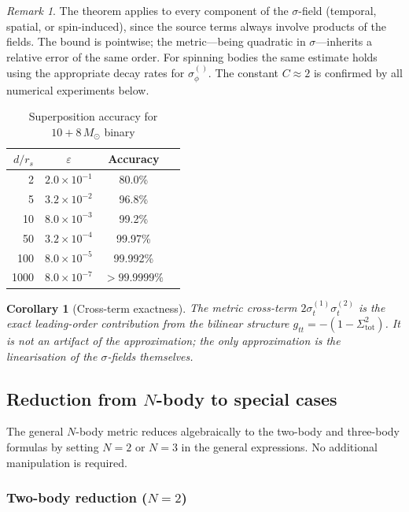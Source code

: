 \documentclass[11pt,a4paper]{article}
\theoremstyle{plain}
\newtheorem{corollary}[theorem]{Corollary}
\theoremstyle{definition}
\theoremstyle{remark}
\newtheorem{remark}{Remark}[section]
\newcommand{\Ms}{M_\odot}
\newcommand{\sig}[2]{\sigma_{#1}^{(#2)}}
\newcommand{\crossterm}[2]{\sigma_t^{(#1)}\sigma_t^{(#2)}}
\newcommand{\Sigt}{\Sigma_{\mathrm{tot}}}
\begin{document}
\begin{remark}
The theorem applies to every component of the $\sigma$-field (temporal, spatial, or spin-induced), since the source terms always involve products of the fields.  The bound is pointwise; the metric---being quadratic in $\sigma$---inherits a relative error of the same order.  For spinning bodies the same estimate holds using the appropriate decay rates for $\sig{\phi}{}$.  The constant $C \approx 2$ is confirmed by all numerical experiments below.
\end{remark}

\begin{table}[h]
  \centering
  \caption{Superposition accuracy for $10+8\,\Ms$ binary}
  \begin{tabular}{@{}rccr@{}}
    \toprule
    $d/r_s$ & $\varepsilon$ & Accuracy \\
    \midrule
    2 & $2.0\times10^{-1}$ & 80.0\% \\
    5 & $3.2\times10^{-2}$ & 96.8\% \\
    10 & $8.0\times10^{-3}$ & 99.2\% \\
    50 & $3.2\times10^{-4}$ & 99.97\% \\
    100 & $8.0\times10^{-5}$ & 99.992\% \\
    1000 & $8.0\times10^{-7}$ & $>99.9999\%$ \\
    \bottomrule
  \end{tabular}
\end{table}

\begin{corollary}[Cross-term exactness]
  The metric cross-term $2\crossterm{1}{2}$ is the exact leading-order contribution from the bilinear structure $g_{tt} = -(1 - \Sigt^2)$.  It is not an artifact of the approximation; the only approximation is the linearisation of the $\sigma$-fields themselves.
\end{corollary}

\subsection{Reduction from $N$-body to special cases}

The general $N$-body metric reduces algebraically to the two-body and three-body formulas by setting $N=2$ or $N=3$ in the general expressions.  No additional manipulation is required.

\subsubsection*{Two-body reduction ($N=2$)}
\end{document}

